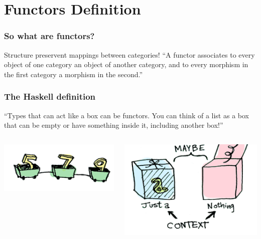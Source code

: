 \documentclass[12pt, xcolor=table]{beamer}
\begin{document}
\section{Functors Definition}
\begin{frame}
    \frametitle{So what are functors?}
    Structure preservent mappings between categories!
    \newline
    \newline
    ``A functor associates to every object of one category an object of another category, and to every morphism in the first category a morphism in the second.''
\end{frame}

\begin{frame}
    \frametitle{The Haskell definition}
    ``Types that can act like a box can be functors. You can think of a list as a box that can be empty or have something inside it, including another box!''
    \vspace{30px}
    \begin{columns}
            \begin{center}
            \includegraphics[scale=0.4]{figures/list.png}
            \end{center}
            \begin{center}
            \includegraphics[scale=0.4]{figures/maybe.png}
            \end{center}
    \end{columns}
\end{frame}
\end{document}
